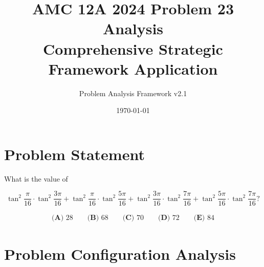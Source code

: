 \documentclass[12pt]{article}
\title{\textbf{AMC 12A 2024 Problem 23 Analysis}\\
\large{Comprehensive Strategic Framework Application}}
\author{Problem Analysis Framework v2.1}
\date{\today}
\begin{document}
\maketitle

\section*{Problem Statement}

What is the value of

\[\tan^2 \frac {\pi}{16} \cdot \tan^2 \frac {3\pi}{16} + \tan^2 \frac {\pi}{16} \cdot \tan^2 \frac {5\pi}{16}+\tan^2 \frac {3\pi}{16} \cdot \tan^2 \frac {7\pi}{16}+\tan^2 \frac {5\pi}{16} \cdot \tan^2 \frac {7\pi}{16}?\]

\begin{align*}
\textbf{(A) } 28 \qquad \textbf{(B) } 68 \qquad \textbf{(C) } 70 \qquad \textbf{(D) } 72 \qquad \textbf{(E) } 84
\end{align*}

\section{Problem Configuration Analysis}
\end{document}
